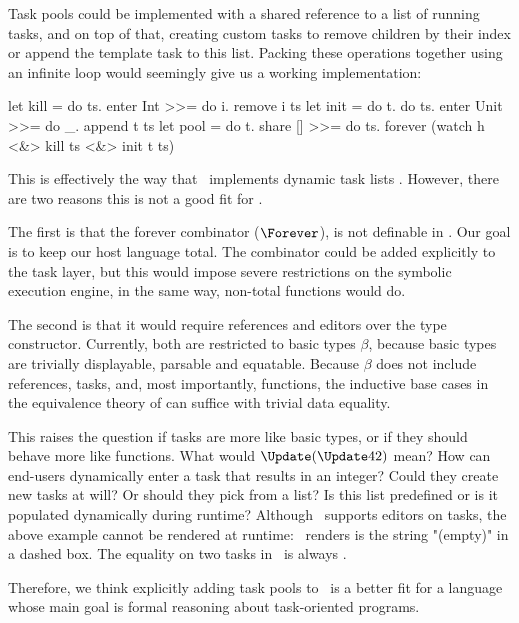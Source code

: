 Task pools could be implemented with a shared reference to a list of running tasks,
and on top of that, creating custom tasks to remove children by their index
or append the template task to this list.
Packing these operations together using an infinite loop would seemingly give us a working implementation:
\begin{TASK}
  let kill = do ts. enter Int >>= do i. remove i ts
  let init = do t. do ts. enter Unit >>= do _. append t ts
  let pool = do t.
    share [] >>= do ts.
    forever (watch h <&> kill ts <&> init t ts)
\end{TASK}
This is effectively the way that \ITASKS\ implements dynamic task lists \cite{conf/pepm/PlasmeijerAKLNG11}.
However, there are two reasons this is not a good fit for \TOPHAT.

The first is that the forever combinator ($\Forever$), is not definable in \TOPHAT.
Our goal is to keep our host language total.
The combinator could be added explicitly to the task layer,
but this would impose severe restrictions on the symbolic execution engine,
in the same way, non-total functions would do.

The second is that it would require references and editors over the  type constructor.
Currently, both are restricted to basic types $\beta$,
because basic types are trivially displayable, parsable and equatable.
Because $\beta$ does not include references, tasks, and, most importantly, functions,
the inductive base cases in the equivalence theory of \citet{conf/sfp/KlijnsmaS22} can suffice with trivial data equality.

This raises the question if tasks are more like basic types, or if they should behave more like functions.
What would $\Update (\Update 42)$ mean?
How can end-users dynamically enter a task that results in an integer?
Could they create new tasks at will?
Or should they pick from a list?
Is this list predefined or is it populated dynamically during runtime?
Although \ITASKS\ supports editors on tasks,
the above example cannot be rendered at runtime:
\ITASKS\ renders is the string "(empty)" in a dashed box.
The equality on two tasks in \ITASKS\ is always .

Therefore, we think explicitly adding task pools to \TOPHAT\ is a better fit for a language whose main goal is formal reasoning about task-oriented programs.
